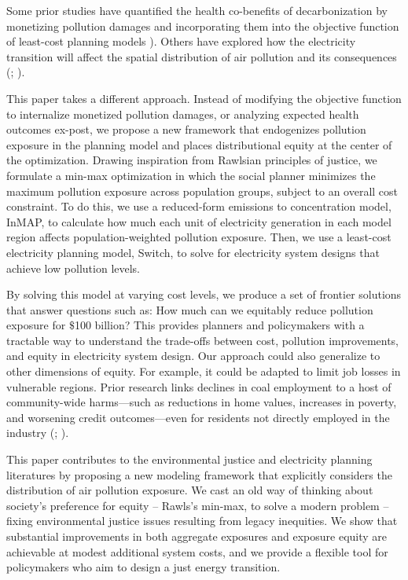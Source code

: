 \documentclass[a4paper]{article}
\theoremstyle{definition}
\theoremstyle{plain}
\begin{document}
Some prior studies have quantified the health co-benefits of decarbonization by monetizing pollution damages and incorporating them into the objective function of least-cost planning models \citep{Sergi2020OptimizingBenefits}). Others have explored how the electricity transition will affect the spatial distribution of air pollution and its consequences (\citet{Shawhan2024PoliciesAmericans}; \citet{Goforth2022AirStrategies}).

This paper takes a different approach. Instead of modifying the objective function to internalize monetized pollution damages, or analyzing expected health outcomes ex-post, we propose a new framework that endogenizes pollution exposure in the planning model and places distributional equity at the center of the optimization. Drawing inspiration from Rawlsian principles of justice, we formulate a min-max optimization in which the social planner minimizes the maximum pollution exposure across population groups, subject to an overall cost constraint. To do this, we use a reduced-form emissions to concentration model, InMAP, to calculate how much each unit of electricity generation in each model region affects population-weighted pollution exposure. Then, we use a least-cost electricity planning model, Switch, to solve for electricity system designs that achieve low pollution levels.

By solving this model at varying cost levels, we produce a set of frontier solutions that answer questions such as: How much can we equitably reduce pollution exposure for $\$$100 billion? This provides planners and policymakers with a tractable way to understand the trade-offs between cost, pollution improvements, and equity in electricity system design. Our approach could also generalize to other dimensions of equity. For example, it could be adapted to limit job losses in vulnerable regions. Prior research links declines in coal employment to a host of community-wide harms—such as reductions in home values, increases in poverty, and worsening credit outcomes—even for residents not directly employed in the industry (\citet{Kraynak2023TheCountry}; \citet{Blonz2023TheFuels}).

This paper contributes to the environmental justice and electricity planning literatures by proposing a new modeling framework that explicitly considers the distribution of air pollution exposure. We cast an old way of thinking about society’s preference for equity – Rawls’s min-max, to solve a modern problem – fixing environmental justice issues resulting from legacy inequities.  We show that substantial improvements in both aggregate exposures and exposure equity are achievable at modest additional system costs, and we provide a flexible tool for policymakers who aim to design a just energy transition.
\end{document}
